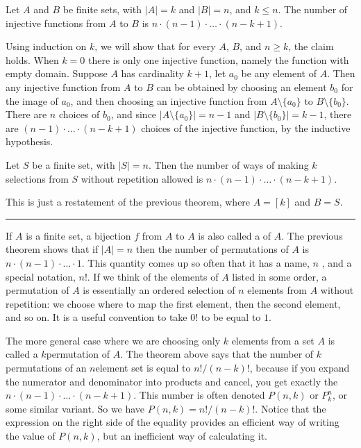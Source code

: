 \documentclass[letterpaper,10pt,english]{sphinxmanual}
\begin{document}
\sphinxAtStartPar
{} Let \(A\) and \(B\) be finite sets, with \(|A| = k\) and \(|B| = n\), and \(k \le n\). The number of injective functions from \(A\) to \(B\) is \(n \cdot (n - 1) \cdot \ldots \cdot (n - k + 1)\).

\sphinxAtStartPar
{} Using induction on \(k\), we will show that for every \(A\), \(B\), and \(n \geq k\), the claim holds. When \(k = 0\) there is only one injective function, namely the function with empty domain. Suppose \(A\) has cardinality \(k + 1\), let \(a_0\) be any element of \(A\). Then any injective function from \(A\) to \(B\) can be obtained by choosing an element \(b_0\) for the image of \(a_0\), and then choosing an injective function from \(A \setminus \{ a_0 \}\) to \(B \setminus \{ b_0 \}\). There are \(n\) choices of \(b_0\), and since \(| A \setminus \{ a_0 \} | = n - 1\) and \(|B \setminus \{ b_0 \} | = k - 1\), there are \((n - 1) \cdot \ldots \cdot (n - k + 1)\) choices of the injective function, by the inductive hypothesis.

\sphinxAtStartPar
{} Let \(S\) be a finite set, with \(|S| = n\). Then the number of ways of making \(k\) selections from \(S\) without repetition allowed is \(n \cdot (n - 1) \cdot \ldots \cdot (n - k + 1)\).

\sphinxAtStartPar
{} This is just a restatement of the previous theorem, where \(A = [k]\) and \(B = S\).


\bigskip\hrule\bigskip


\sphinxAtStartPar
If \(A\) is a finite set, a bijection \(f\) from \(A\) to \(A\) is also called a  of \(A\). The previous theorem shows that if \(|A| = n\) then the number of permutations of \(A\) is \(n \cdot (n - 1) \cdot \ldots \cdot 1\). This quantity comes up so often that it has a name, \(n\) , and a special notation, \(n!\). If we think of the elements of \(A\) listed in some order, a permutation of \(A\) is essentially an ordered selection of \(n\) elements from \(A\) without repetition: we choose where to map the first element, then the second element, and so on. It is a useful convention to take \(0!\) to be equal to \(1\).

\sphinxAtStartPar
The more general case where we are choosing only \(k\) elements from a set \(A\) is called a \(k\)\sphinxhyphen{}permutation of \(A\). The theorem above says that the number of \(k\)\sphinxhyphen{}permutations of an \(n\)\sphinxhyphen{}element set is equal to \(n! / (n - k)!\), because if you expand the numerator and denominator into products and cancel, you get exactly the \(n \cdot (n - 1) \cdot \ldots \cdot (n - k + 1)\). This number is often denoted \(P(n, k)\) or \(P^n_k\), or some similar variant. So we have \(P(n, k) = n! / (n - k)!\). Notice that the expression on the right side of the equality provides an efficient way of writing the value of \(P(n, k)\), but an inefficient way of calculating it.
\end{document}
